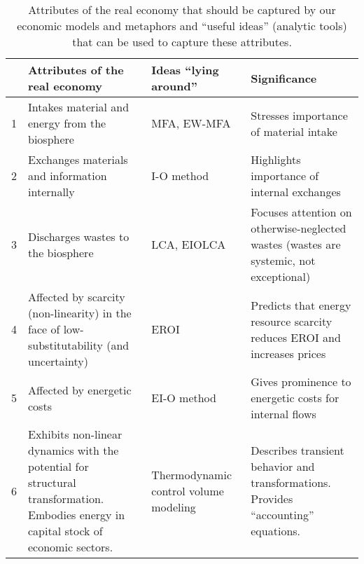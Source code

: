 {
\renewcommand{\arraystretch}{1.5}
\setlength{\tabcolsep}{10pt}

\begin{landscape}
\begin{table}
\label{tab:metabolic_economy}
\caption{Attributes of the real economy that should be captured by our economic models and metaphors 
				and ``useful ideas'' (analytic tools) that can be used to capture these attributes.}
\begin{tabular}{m{0.1cm}m{7cm}m{4cm}m{5cm}}
\toprule
																													&	
	Attributes of the real economy		&
	Ideas “lying around”																					&
	Significance																								\\
\midrule
1																													&	
	Intakes material and energy from the biosphere										&
	MFA, EW-MFA																							&
	Stresses importance of material intake													\\
2																													&
	Exchanges materials and information internally										&
	I-O method																								&
	Highlights importance of internal exchanges											\\
3																													&
	Discharges wastes to the biosphere															&
	LCA, EIOLCA																								&
	Focuses attention on otherwise-neglected wastes 
		(wastes are systemic, not exceptional)												\\
4																													&
	Affected by scarcity (non-linearity) in the face of 
		low-substitutability (and uncertainty)													&
		EROI																										&
		Predicts that energy resource scarcity reduces EROI 
			and increases prices																			\\
5																													&
	Affected by energetic costs																		&
	EI-O method																								&
	Gives prominence to energetic costs for internal flows							\\
6																													&
	Exhibits non-linear dynamics with 
		the potential for structural transformation.
		Embodies energy in capital stock of economic sectors.						&
	Thermodynamic control volume modeling												&
	Describes transient behavior and transformations.
		Provides “accounting” equations.															\\
\bottomrule
\end{tabular}
\end{table}
\end{landscape}

}

